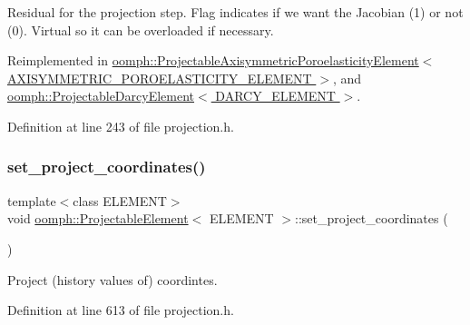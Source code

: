 Residual for the projection step. Flag indicates if we want the Jacobian (1) or not (0). Virtual so it can be overloaded if necessary. 



Reimplemented in \hyperlink{classoomph_1_1ProjectableAxisymmetricPoroelasticityElement_a0ae5521eeba28eeef8eb28741597ea44}{oomph\+::\+Projectable\+Axisymmetric\+Poroelasticity\+Element$<$ A\+X\+I\+S\+Y\+M\+M\+E\+T\+R\+I\+C\+\_\+\+P\+O\+R\+O\+E\+L\+A\+S\+T\+I\+C\+I\+T\+Y\+\_\+\+E\+L\+E\+M\+E\+N\+T $>$}, and \hyperlink{classoomph_1_1ProjectableDarcyElement_abfbe95045be80a5aacaa0f3a714468fe}{oomph\+::\+Projectable\+Darcy\+Element$<$ D\+A\+R\+C\+Y\+\_\+\+E\+L\+E\+M\+E\+N\+T $>$}.



Definition at line 243 of file projection.\+h.

\mbox{\label{classoomph_1_1ProjectableElement_ada702d9b155574b33a31c3693f268887}} 
\subsubsection{\texorpdfstring{set\+\_\+project\+\_\+coordinates()}{set\_project\_coordinates()}}
{\footnotesize\ttfamily template$<$class E\+L\+E\+M\+E\+NT$>$ \\
void \hyperlink{classoomph_1_1ProjectableElement}{oomph\+::\+Projectable\+Element}$<$ E\+L\+E\+M\+E\+NT $>$\+::set\+\_\+project\+\_\+coordinates (\begin{DoxyParamCaption}{ }\end{DoxyParamCaption})\hspace{0.3cm}{\ttfamily [inline]}}



Project (history values of) coordintes. 



Definition at line 613 of file projection.\+h.

\mbox{\label{classoomph_1_1ProjectableElement_ae1a46981a1ca1b4f9f1ef1783a168cf4}} 

